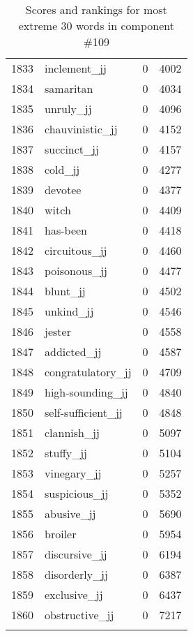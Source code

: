 \begin{longtable}[!htbp]{| rlr@{.}l |}
    1833 & inclement\_jj & 0 & 4002 \\
    1834 & samaritan & 0 & 4034 \\
    1835 & unruly\_jj & 0 & 4096 \\
    1836 & chauvinistic\_jj & 0 & 4152 \\
    1837 & succinct\_jj & 0 & 4157 \\
    1838 & cold\_jj & 0 & 4277 \\
    1839 & devotee & 0 & 4377 \\
    1840 & witch & 0 & 4409 \\
    1841 & has-been & 0 & 4418 \\
    1842 & circuitous\_jj & 0 & 4460 \\
    1843 & poisonous\_jj & 0 & 4477 \\
    1844 & blunt\_jj & 0 & 4502 \\
    1845 & unkind\_jj & 0 & 4546 \\
    1846 & jester & 0 & 4558 \\
    1847 & addicted\_jj & 0 & 4587 \\
    1848 & congratulatory\_jj & 0 & 4709 \\
    1849 & high-sounding\_jj & 0 & 4840 \\
    1850 & self-sufficient\_jj & 0 & 4848 \\
    1851 & clannish\_jj & 0 & 5097 \\
    1852 & stuffy\_jj & 0 & 5104 \\
    1853 & vinegary\_jj & 0 & 5257 \\
    1854 & suspicious\_jj & 0 & 5352 \\
    1855 & abusive\_jj & 0 & 5690 \\
    1856 & broiler & 0 & 5954 \\
    1857 & discursive\_jj & 0 & 6194 \\
    1858 & disorderly\_jj & 0 & 6387 \\
    1859 & exclusive\_jj & 0 & 6437 \\
    1860 & obstructive\_jj & 0 & 7217 \\
    \hline
    \caption{Scores and rankings for most extreme 30 words in component \#109} \\
\end{longtable}
